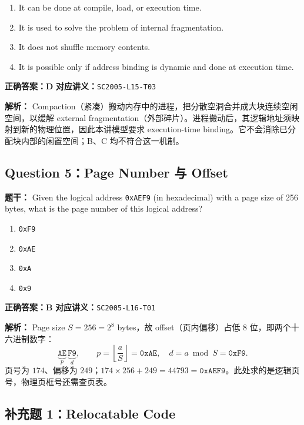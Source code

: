 \documentclass[11pt,a4paper,fontset=fandol]{ctexart}
\renewcommand{\exercisequestion}[2]{%
  \Needspace{5\baselineskip}%
  \subsection{#2}\label{exercise:#1}%
}
\renewenvironment{checkedsolution}
  {\par\nopagebreak[4]\textbf{解析：}\ignorespaces}
  {\par}
\begin{document}
\begin{enumerate}[label=\Alph*.,leftmargin=2.4em]
  \item It can be done at compile, load, or execution time.
  \item It is used to solve the problem of internal fragmentation.
  \item It does not shuffle memory contents.
  \item It is possible only if address binding is dynamic and done at execution time.
\end{enumerate}

\textbf{正确答案：D}\qquad
\textbf{对应讲义：}\texttt{SC2005-L15-T03}

\begin{checkedsolution}
Compaction（紧凑）搬动内存中的进程，把分散空洞合并成大块连续空闲空间，以缓解 external fragmentation（外部碎片）。进程搬动后，其逻辑地址须映射到新的物理位置，因此本讲模型要求 execution-time binding。它不会消除已分配块内部的闲置空间；B、C 均不符合这一机制。
\end{checkedsolution}

\exercisequestion{SC2005-HW05-Q05}{Question 5：Page Number 与 Offset}

\textbf{题干：} Given the logical address \texttt{0xAEF9} (in hexadecimal) with a page size of 256 bytes, what is the page number of this logical address?

\begin{enumerate}[label=\Alph*.,leftmargin=2.4em]
  \item \texttt{0xF9}
  \item \texttt{0xAE}
  \item \texttt{0xA}
  \item \texttt{0x9}
\end{enumerate}

\textbf{正确答案：B}\qquad
\textbf{对应讲义：}\texttt{SC2005-L16-T01}

\begin{checkedsolution}
Page size $S=256=2^8$ bytes，故 offset（页内偏移）占低 8 位，即两个十六进制数字：
\[
  \underbrace{\texttt{AE}}_{p}\,
  \underbrace{\texttt{F9}}_{d},\qquad
  p=\left\lfloor\frac{a}{S}\right\rfloor=\texttt{0xAE},\quad
  d=a\bmod S=\texttt{0xF9}.
\]
页号为 $174$、偏移为 $249$；$174\times256+249=44793=\texttt{0xAEF9}$。此处求的是逻辑页号，物理页框号还需查页表。
\end{checkedsolution}

\exercisequestion{SC2005-HW05-Q06}{补充题 1：Relocatable Code}
\end{document}

